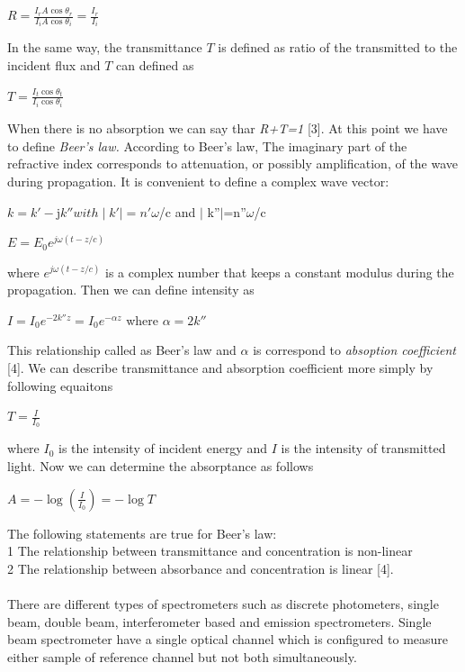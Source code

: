 \documentclass[a4paper,12pt]{report}
\begin{document}
\begin{center}
	{\large $R=\frac{I_{r}A\cos\theta_{r}}{I_{i}A\cos\theta_{i}}=\frac{I_{r}}{I_{i}}$}
\end{center}
In the same way, the transmittance $T$ is defined as ratio of the transmitted to the incident flux and $T$ can defined as 
\begin{center}
	{\large $T=\frac{I_{t}\cos\theta_{t}}{I_{i}\cos\theta_{i}}$}
\end{center}
When there is no absorption we can say thar \textit{R+T=1} [3]. At this point we have to define \textit{Beer's law.} According to Beer's law, The imaginary part of the refractive index corresponds to attenuation, or possibly
amplification, of the wave during propagation. It is convenient to define
a complex wave vector:
\begin{center}
$k=k'-$j$k'' with \mid k'\mid=n'$$\omega$/c and $\mid$ k''$\mid$=n''$\omega$/c 
\end{center} 	
\begin{center}
	$E=E_{0} e^{j\omega(t-z/c)}$
\end{center}
where $e^{j\omega(t-z/c)}$ is a complex number that keeps a constant modulus during the propagation. Then we can define intensity as 
\begin{center}
	$I=I_{0}e^{-2k''z}=I_{0}e^{-\alpha z}$ where $\alpha=2k''$
\end{center}
This relationship called as Beer's law and $\alpha$ is correspond to \textit{absoption coefficient} [4]. We can describe transmittance and absorption coefficient more simply by following equaitons
\begin{center}
	{\large $T=\frac{I}{I_{0}}$}
\end{center}
where $I_{0}$ is the intensity of incident energy and $I$ is the intensity of transmitted light. Now we can determine the absorptance as follows 
\begin{center}
	$A=-\log(\frac{I}{I_{0}})=-\log T$
\end{center} 
The following statements are true for Beer's law:\\
1	The relationship between transmittance and concentration is non-linear\\2	The relationship between absorbance and concentration is linear [4].\\\\
There are different types of spectrometers such as discrete photometers, single beam, double beam, interferometer based and emission spectrometers. Single beam spectrometer have a single optical channel which is configured to measure either sample of reference channel but not both simultaneously.\\\\
\end{document}
